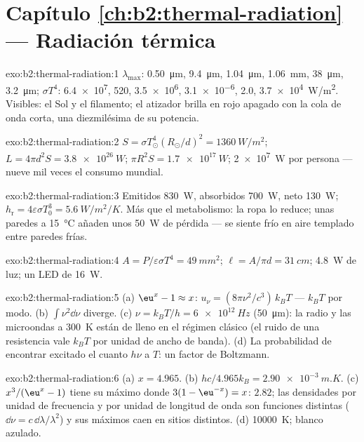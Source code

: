 \section*{Capítulo \ref{ch:b2:thermal-radiation} --- Radiación térmica}

\begin{solution}{exo:b2:thermal-radiation:1}
$\lambda_{\max}$: \qty{0.50}{\micro m}, \qty{9.4}{\micro m}, \qty{1.04}{\micro m},
\qty{1.06}{mm}, \qty{38}{\micro m}, \qty{3.2}{\micro m}; $\sigma T^4$: \qty{6.4e7}{},
\qty{520}{}, \qty{3.5e6}{}, \qty{3.1e-6}{}, \qty{2.0}{}, \qty{3.7e4}{W/m^2}. Visibles:
el Sol y el filamento; el atizador brilla en rojo apagado con la cola de onda
corta, una diezmilésima de su potencia.
\end{solution}

\begin{solution}{exo:b2:thermal-radiation:2}
$S = \sigma T_\odot^4(R_\odot/d)^2 = \qty{1360}{W/m^2}$; $L = 4\pi d^2S =
\qty{3.8e26}{W}$; $\pi R^2S = \qty{1.7e17}{W}$; \qty{2e7}{W} por persona --- nueve
mil veces el consumo mundial.
\end{solution}

\begin{solution}{exo:b2:thermal-radiation:3}
Emitidos \qty{830}{W}, absorbidos \qty{700}{W}, neto \qty{130}{W}; $h_{\text{r}} =
4\varepsilon\sigma T_0^3 = \qty{5.6}{W/m^2/K}$. Más que el metabolismo:
la ropa lo reduce; unas paredes a \qty{15}{\celsius} añaden unos \qty{50}{W} de pérdida
--- se siente frío en aire templado entre paredes frías.
\end{solution}

\begin{solution}{exo:b2:thermal-radiation:4}
$A = P/\varepsilon\sigma T^4 = \qty{49}{mm^2}$; $\ell = A/\pi d = \qty{31}{cm}$;
\qty{4.8}{W} de luz; un LED de \qty{16}{W}.
\end{solution}

\begin{solution}{exo:b2:thermal-radiation:5}
(a) $\eu^x - 1 \approx x$: $u_\nu = (8\pi\nu^2/c^3)\,k_BT$ --- $k_BT$ por modo.
(b) $\int\nu^2\dd\nu$ diverge. (c) $\nu = k_BT/h = \qty{6e12}{Hz}$ (\qty{50}{\micro m}):
la radio y las microondas a \qty{300}{K} están de lleno en el régimen clásico (el
ruido de una resistencia vale $k_BT$ por unidad de ancho de banda). (d) La probabilidad de
encontrar excitado el cuanto $h\nu$ a $T$: un factor de Boltzmann.
\end{solution}

\begin{solution}{exo:b2:thermal-radiation:6}
(a) $x = 4.965$. (b) $hc/4.965k_B = \qty{2.90e-3}{m.K}$. (c) $x^3/(\eu^x - 1)$
tiene su máximo donde $3(1 - \eu^{-x}) = x$: $2.82$; las densidades por unidad de frecuencia
y por unidad de longitud de onda son funciones distintas ($\dd\nu = c\,\dd\lambda/\lambda^2$)
y sus máximos caen en sitios distintos. (d) \qty{10000}{K}; blanco azulado.
\end{solution}

